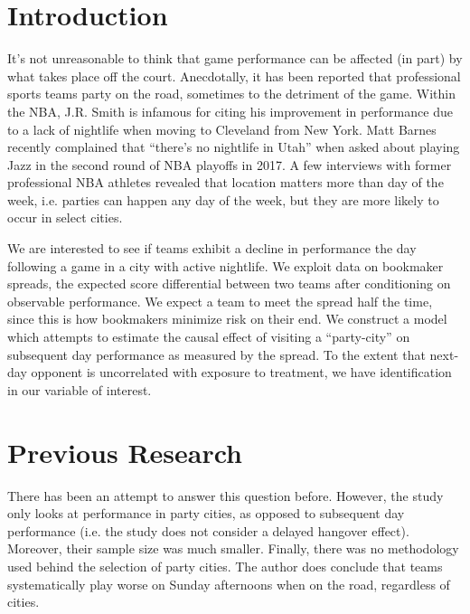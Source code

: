 \documentclass[letterpaper,12pt]{article}
\begin{document}

\section{Introduction}
It's not unreasonable to think that game performance can be affected 
(in part) by what takes place off the court. 
Anecdotally, it has been reported that professional sports teams party on 
the road, sometimes to the detriment of the game.
Within the NBA, J.R. Smith is infamous for citing his improvement in performance due to a
lack of nightlife when moving to Cleveland from New York.\cite{price,ley}
Matt Barnes recently complained that ``there's no nightlife in Utah'' when 
asked about playing Jazz in the second round of NBA playoffs in 2017.\cite{cestone}
A few interviews with former professional NBA athletes revealed that location
matters more than day of the week, i.e. parties can happen any day of the week,
but they are more likely to occur in select cities.

We are interested to see if 
teams exhibit a decline in performance the day following a game in a city 
with active nightlife. We exploit data on bookmaker spreads, the expected score 
differential between two teams after conditioning on observable performance. 
We expect a team to meet the spread half the time, since this is how bookmakers 
minimize risk on their end. We construct a model which attempts to 
estimate the causal effect of  visiting a ``party-city'' on subsequent day 
performance as measured by the spread. To the extent that next-day
opponent is uncorrelated with exposure to treatment, we have identification in our variable of interest.

\section{Previous Research}
There has been an attempt to answer this question before.\cite{ezekowitz} 
However, the study only
looks at performance in party cities, as opposed to subsequent day performance (i.e. the study does not consider a delayed hangover effect). Moreover, their sample size was much smaller. 
Finally, there was no methodology used behind the selection of party cities. The author does conclude
that teams systematically play worse on Sunday afternoons when on the road,
regardless of cities.
\end{document}
